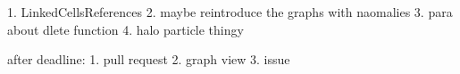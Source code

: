 1. LinkedCellsReferences
2. maybe reintroduce the graphs with naomalies
3. para about dlete function
4. halo particle thingy 

after deadline:
1. pull request
2. graph view 
3. issue